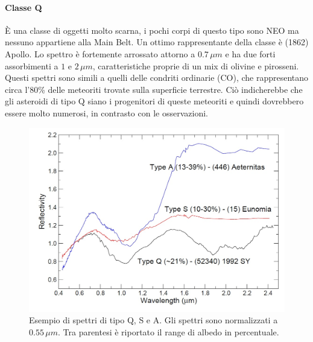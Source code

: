 \paragraph*{Classe Q}
È una classe di oggetti molto scarna, i pochi corpi di questo tipo sono NEO ma nessuno appartiene alla Main Belt. Un ottimo rappresentante della classe è (1862) Apollo. Lo spettro è fortemente arrossato attorno a $0.7\,\mu m$ e ha due forti assorbimenti a $1$ e $2\,\mu m$, caratteristiche proprie di un mix di olivine e pirosseni.\\
Questi spettri sono simili a quelli delle condriti ordinarie (CO), che rappresentano circa l'80\% delle meteoriti trovate sulla superficie terrestre. Ciò indicherebbe che gli asteroidi di tipo Q siano i progenitori di queste meteoriti e quindi dovrebbero essere molto numerosi, in contrasto con le osservazioni.

\begin{figure}[!h]
\centering
\includegraphics[scale=0.3]{figure/spettro_qsa.jpg}
\caption[Esempio di spettri di tipo Q, S e A.]{Esempio di spettri di tipo Q, S e A. Gli spettri sono normalizzati a $0.55\,\mu m$. Tra parentesi è riportato il range di albedo in percentuale. \citep{magrin_spectroscopic_nodate}}
\label{spettro_qsa}
\end{figure}

